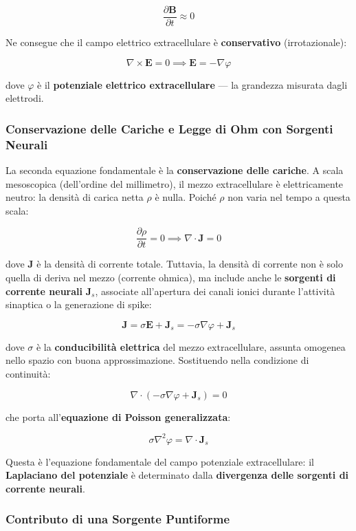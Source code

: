 $$ \frac{\partial \mathbf{B}}{\partial t} \approx 0 $$

Ne consegue che il campo elettrico extracellulare è \textbf{conservativo} (irrotazionale):

$$ \nabla \times \mathbf{E} = 0 \implies \mathbf{E} = -\nabla \varphi $$

dove $\varphi$ è il \textbf{potenziale elettrico extracellulare} — la grandezza misurata dagli elettrodi.

\subsubsection{Conservazione delle Cariche e Legge di Ohm con Sorgenti Neurali}

La seconda equazione fondamentale è la \textbf{conservazione delle cariche}. A scala mesoscopica (dell'ordine del millimetro), il mezzo extracellulare è elettricamente neutro: la densità di carica netta $\rho$ è nulla. Poiché $\rho$ non varia nel tempo a questa scala:

$$ \frac{\partial \rho}{\partial t} = 0 \implies \nabla \cdot \mathbf{J} = 0 $$

dove \textbf{J} è la densità di corrente totale. Tuttavia, la densità di corrente non è solo quella di deriva nel mezzo (corrente ohmica), ma include anche le \textbf{sorgenti di corrente neurali} $\mathbf{J}_s$, associate all'apertura dei canali ionici durante l'attività sinaptica o la generazione di spike:

$$ \mathbf{J} = \sigma \mathbf{E} + \mathbf{J}_s = -\sigma \nabla \varphi + \mathbf{J}_s $$

dove $\sigma$ è la \textbf{conducibilità elettrica} del mezzo extracellulare, assunta omogenea nello spazio con buona approssimazione. Sostituendo nella condizione di continuità:

$$ \nabla \cdot \left( -\sigma \nabla \varphi + \mathbf{J}_s \right) = 0 $$

che porta all'\textbf{equazione di Poisson generalizzata}:

$$ \sigma \nabla^2 \varphi = \nabla \cdot \mathbf{J}_s $$

Questa è l'equazione fondamentale del campo potenziale extracellulare: il \textbf{Laplaciano del potenziale} è determinato dalla \textbf{divergenza delle sorgenti di corrente neurali}.

\subsubsection{Contributo di una Sorgente Puntiforme}

